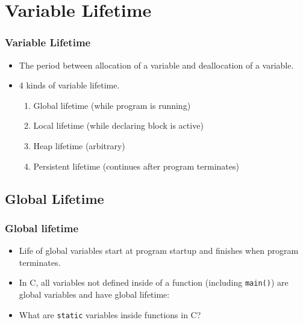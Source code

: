 \section{Variable Lifetime}
\begin{frame}
\frametitle{Variable Lifetime}
\begin{itemize}
 \item {} The period between allocation of a variable and
 deallocation of a variable.
 \item 4 kinds of variable lifetime.
\begin{enumerate}
 \item Global lifetime (while program is running)
 \item Local lifetime (while declaring block is active)
 \item Heap lifetime (arbitrary)
 \item Persistent lifetime (continues after program terminates)
\end{enumerate}
\end{itemize}
\end{frame}

\subsection{Global Lifetime}
\begin{frame}
 \frametitle{Global lifetime}
\begin{itemize}[<+->]
 \item Life of global variables start at program startup and finishes when program terminates.
 \item In C, all variables not defined inside of a function (including \texttt{main()}) are
 global variables and have global lifetime:\\
\item What are \texttt{static} variables inside functions in C?
\end{itemize}
\end{frame}

